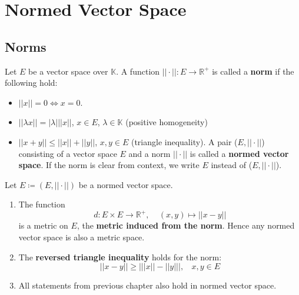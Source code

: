 \chapter{Normed Vector Space}

\section{Norms}

\begin{definition}[Norm]\label{def: norm}
    Let \(E\) be a vector space over \(\mathbb{K}\). A function \(|| \cdot || \colon E \to
    \mathbb{R}^+\) is called a \textbf{norm} if the following hold:
    \begin{itemize}
        \item \( || x || = 0 \Leftrightarrow x = 0\). 
        \item \( || \lambda x|| = |\lambda| || x || \), \(x \in E\), \(\lambda \in \mathbb{K}\)
        (positive homogeneity)
        \item \( || x + y || \leq || x || + || y ||\), \(x, y \in E\) (triangle inequality).
        A pair (\(E, ||\cdot||\)) consisting of a vector space \(E\) and a norm
        \(||\cdot||\) is called a \textbf{normed vector space}. If the norm is clear from context,
        we write \(E\) instead of (\(E, || \cdot||\)).  
    \end{itemize}
\end{definition}

\begin{remark}
    Let \(E \coloneqq \left(E, ||\cdot||\right)\) be a normed vector space. 
    \begin{enumerate}[label=(\alph*)]
        \item The function 
        \[
            d \colon E \times E \to \mathbb{R}^+ , \:\:\:\:\: (x, y) \mapsto ||x-y||  
        \]
        is a metric on \(E\), the \textbf{metric induced from the norm}. Hence any 
        normed vector space is also a metric space. 
        \item The \textbf{reversed triangle inequality} holds for the norm:
        \[
            || x - y || \geq \left |  || x || - || y ||  \right |, \:\:\:\: x,y \in E  
        \]

        \item All statements from previous chapter also hold in normed vector space. 
    \end{enumerate}
\end{remark}